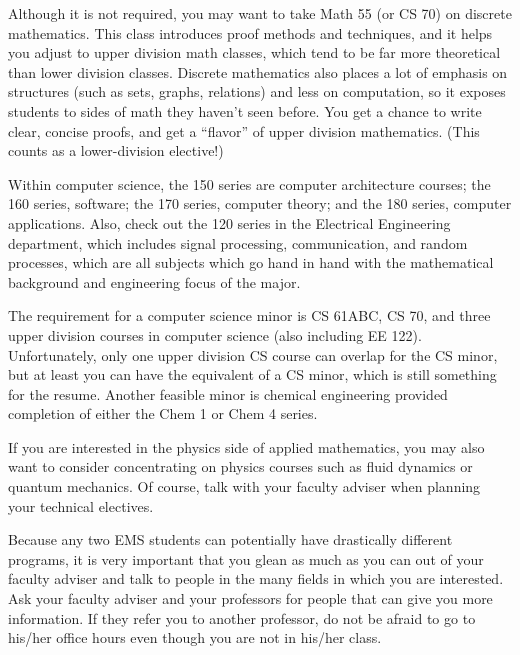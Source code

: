 Although it is not required, you may want to take Math 55 (or CS 70) on discrete mathematics. This class introduces proof methods and techniques, and it helps you adjust to upper division math classes, which tend to be far more theoretical than lower division classes. Discrete mathematics also places a lot of emphasis on structures (such as sets, graphs, relations) and less on computation, so it exposes students to sides of math they haven't seen before. You get a chance to write clear, concise proofs, and get a “flavor” of upper division mathematics. (This counts as a lower-division elective!)

Within computer science, the 150 series are computer architecture courses; the 160 series, software; the 170 series, computer theory; and the 180 series, computer applications. 
Also, check out the 120 series in the Electrical Engineering department, which includes signal processing, communication, and random processes, which are all subjects which go hand in hand with the mathematical background and engineering focus of the major.

The requirement for a computer science minor is CS 61ABC, CS 70, and three upper division courses in computer science (also including EE 122).
Unfortunately, only one upper division CS course can overlap for the CS minor, but at least you can have the equivalent of a CS minor, which is still something for the resume. Another feasible minor is chemical engineering provided completion of either the Chem 1 or Chem 4 series.

If you are interested in the physics side of applied mathematics, you may also want to consider concentrating on physics courses such as fluid dynamics or quantum mechanics. Of course, talk with your faculty adviser when planning your technical electives.

Because any two EMS students can potentially have drastically different programs, it is very important that you glean as much as you can out of your faculty adviser and talk to people in the many fields in which you are interested. Ask your faculty adviser and your professors for people that can give you more information. If they refer you to another professor, do not be afraid to go to his/her office hours even though you are not in his/her class.

